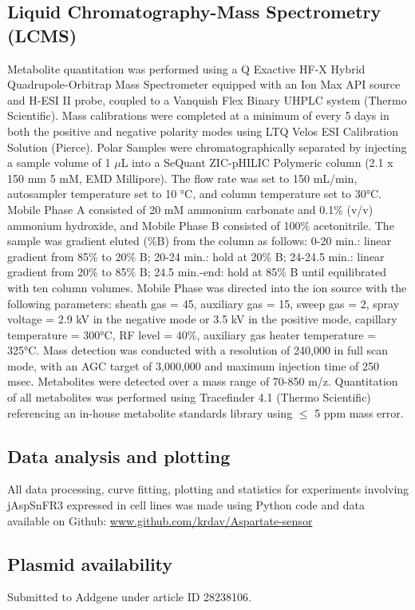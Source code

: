 \subsection{Liquid Chromatography-Mass Spectrometry (LCMS)}
Metabolite quantitation was performed using a Q Exactive HF-X Hybrid Quadrupole-Orbitrap Mass Spectrometer equipped with an Ion Max API source and H-ESI II probe, coupled to a Vanquish Flex Binary UHPLC system (Thermo Scientific).
Mass calibrations were completed at a minimum of every 5 days in both the positive and negative polarity modes using LTQ Velos ESI Calibration Solution (Pierce).
Polar Samples were chromatographically separated by injecting a sample volume of 1 $\mu$L into a SeQuant ZIC-pHILIC Polymeric column (2.1 x 150 mm 5 mM, EMD Millipore).
The flow rate was set to 150 mL/min, autosampler temperature set to 10 °C, and column temperature set to 30°C.
Mobile Phase A consisted of 20 mM ammonium carbonate and 0.1\% (v/v) ammonium hydroxide, and Mobile Phase B consisted of 100\% acetonitrile.
The sample was gradient eluted (\%B) from the column as follows: 0-20 min.: linear gradient from 85\% to 20\% B; 20-24 min.: hold at 20\% B; 24-24.5 min.: linear gradient from 20\% to 85\% B; 24.5 min.-end: hold at 85\% B until equilibrated with ten column volumes.
Mobile Phase was directed into the ion source with the following parameters: sheath gas = 45, auxiliary gas = 15, sweep gas = 2, spray voltage = 2.9 kV in the negative mode or 3.5 kV in the positive mode, capillary temperature = 300°C, RF level = 40\%, auxiliary gas heater temperature = 325°C.
Mass detection was conducted with a resolution of 240,000 in full scan mode, with an AGC target of 3,000,000 and maximum injection time of 250 msec.
Metabolites were detected over a mass range of 70-850 m/z.
Quantitation of all metabolites was performed using Tracefinder 4.1 (Thermo Scientific) referencing an in-house metabolite standards library using $\leq$ 5 ppm mass error.

\subsection{Data analysis and plotting}
All data processing, curve fitting, plotting and statistics for experiments involving jAspSnFR3 expressed in cell lines was made using Python code and data available on Github:
\url{www.github.com/krdav/Aspartate-sensor}

\subsection{Plasmid availability}
Submitted to Addgene under article ID 28238106.

